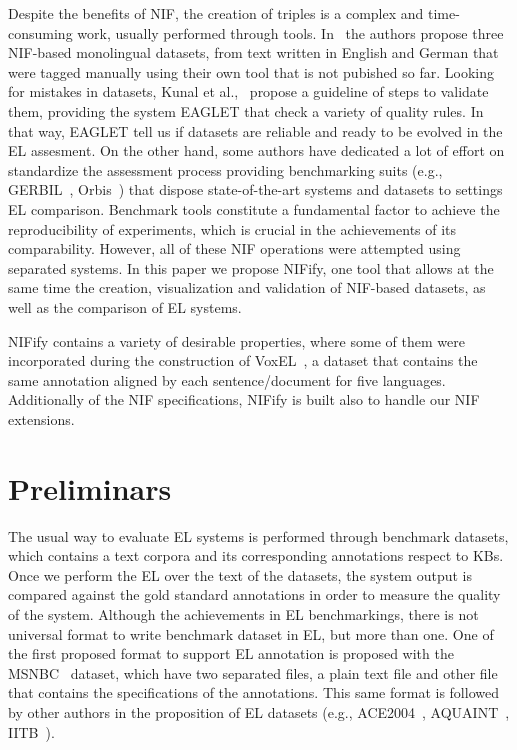 \documentclass{llncs}
\begin{document}
Despite the benefits of NIF, the creation of triples is a complex and time-consuming work, usually performed through tools. In~\cite{N3} the authors propose three NIF-based monolingual datasets, from text written in English and German that were tagged manually using their own tool that is not pubished so far. Looking for mistakes in datasets,  Kunal et al.,~\cite{Kunal2017} propose a guideline of steps to validate them, providing the system EAGLET that check a variety of quality rules. In that way, EAGLET tell us if datasets are reliable and ready to be evolved in the EL assesment. On the other hand, some authors have dedicated a lot of effort on standardize the assessment process providing benchmarking suits (e.g., GERBIL~\cite{gerbil-2015}, Orbis~\cite{Orbis2018}) that dispose state-of-the-art systems and datasets to settings EL comparison. Benchmark tools constitute a fundamental factor to achieve the reproducibility of experiments, which is crucial in the achievements of its comparability. However, all of these NIF operations were attempted using separated systems. In this paper we propose NIFify, one tool that allows at the same time the creation, visualization and validation of NIF-based datasets, as well as the comparison of EL systems. 

NIFify contains a variety of desirable properties, where some of them were incorporated during the construction of VoxEL~\cite{VoxEL2018}, a dataset that contains the same annotation aligned by each sentence/document for five languages. Additionally of the NIF specifications, NIFify is built also to handle our NIF extensions. 




\section{Preliminars}
\label{sec:nif}


The usual way to evaluate EL systems is performed through benchmark datasets, which contains a text corpora and its corresponding annotations respect to KBs. Once we perform the EL over the text of the datasets, the system output is compared against the gold standard annotations in order to measure the quality of the system. Although the achievements in EL benchmarkings, there is not universal format to write benchmark dataset in EL, but more than one. One of the first proposed format to support EL annotation is proposed with the MSNBC~\cite{cucerzan2007large} dataset, which have two separated files, a plain text file and other file that contains the specifications of the annotations. This same format is followed by other authors in the proposition of EL datasets (e.g., ACE2004~\cite{aquaint}, AQUAINT~\cite{aquaint}, IITB~\cite{IITB2009}). 
\end{document}
